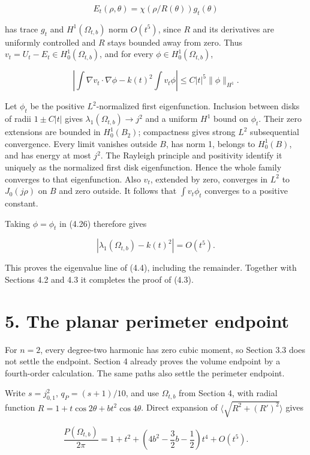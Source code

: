 \documentclass[11pt]{article}
\begin{document}
\[
E_t(\rho,\theta)=\chi(\rho/R(\theta))g_t(\theta)
\tag{4.25}
\]

has trace \(g_t\) and \(H^1(\Omega_{t,b})\) norm \(O(t^5)\), since \(R\)
and its derivatives are uniformly controlled and \(R\) stays bounded
away from zero. Thus \(v_t=U_t-E_t\in H^1_0(\Omega_{t,b})\), and for
every \(\phi\in H^1_0(\Omega_{t,b})\),

\[
\left|\int\nabla v_t\cdot\nabla\phi-k(t)^2\int v_t\phi\right|
\le C|t|^5\|\phi\|_{H^1}.
\tag{4.26}
\]

Let \(\phi_t\) be the positive \(L^2\)-normalized first eigenfunction.
Inclusion between disks of radii \(1\pm C|t|\) gives
\(\lambda_1(\Omega_{t,b})\to j^2\) and a uniform \(H^1\) bound on
\(\phi_t\). Their zero extensions are bounded in \(H^1_0(B_2)\);
compactness gives strong \(L^2\) subsequential convergence. Every limit
vanishes outside \(B\), has norm 1, belongs to \(H^1_0(B)\), and has
energy at most \(j^2\). The Rayleigh principle and positivity identify
it uniquely as the normalized first disk eigenfunction. Hence the whole
family converges to that eigenfunction. Also \(v_t\), extended by zero,
converges in \(L^2\) to \(J_0(j\rho)\) on \(B\) and zero outside. It
follows that \(\int v_t\phi_t\) converges to a positive constant.

Taking \(\phi=\phi_t\) in (4.26) therefore gives

\[
|\lambda_1(\Omega_{t,b})-k(t)^2|=O(t^5).
\tag{4.27}
\]

This proves the eigenvalue line of (4.4), including the remainder.
Together with Sections 4.2 and 4.3 it completes the proof of (4.3).

\section{5. The planar perimeter
endpoint}\label{the-planar-perimeter-endpoint}

For \(n=2\), every degree-two harmonic has zero cubic moment, so Section
3.3 does not settle the endpoint. Section 4 already proves the volume
endpoint by a fourth-order calculation. The same paths also settle the
perimeter endpoint.

Write \(s=j_{0,1}^2\), \(q_P=(s+1)/10\), and use \(\Omega_{t,b}\) from
Section 4, with radial function \(R=1+t\cos2\theta+bt^2\cos4\theta\).
Direct expansion of \(\langle\sqrt{R^2+(R')^2}\rangle\) gives

\[
\frac{P(\Omega_{t,b})}{2\pi}
=1+t^2+\left(4b^2-\frac32b-\frac12\right)t^4+O(t^5).
\tag{5.1}
\]
\end{document}
